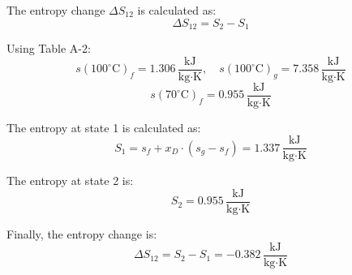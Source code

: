 The entropy change \( \Delta S_{12} \) is calculated as:  
\[
\Delta S_{12} = S_2 - S_1
\]

Using Table A-2:  
\[
s(100^\circ \text{C})_f = 1.306 \, \frac{\text{kJ}}{\text{kg·K}}, \quad s(100^\circ \text{C})_g = 7.358 \, \frac{\text{kJ}}{\text{kg·K}}
\]  
\[
s(70^\circ \text{C})_f = 0.955 \, \frac{\text{kJ}}{\text{kg·K}}
\]

The entropy at state 1 is calculated as:  
\[
S_1 = s_f + x_D \cdot (s_g - s_f) = 1.337 \, \frac{\text{kJ}}{\text{kg·K}}
\]

The entropy at state 2 is:  
\[
S_2 = 0.955 \, \frac{\text{kJ}}{\text{kg·K}}
\]

Finally, the entropy change is:  
\[
\Delta S_{12} = S_2 - S_1 = -0.382 \, \frac{\text{kJ}}{\text{kg·K}}
\]